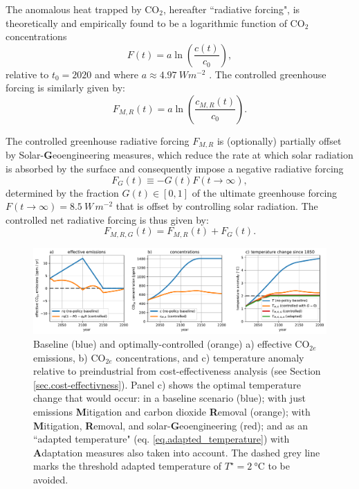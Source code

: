 \documentclass{article}
\begin{document}
The anomalous heat trapped by CO$_{2}$, hereafter ``radiative forcing", is theoretically and empirically found to be a logarithmic function of CO$_{2}$ concentrations
\begin{equation}
    F(t) = a \ln(\frac{c(t)}{c_{0}}),
\end{equation}
relative to $t_{0} = 2020$ and where $a \approx \SI{4.97}{W m^{-2}}$ \citep{geoffroy_transient_2012}. The controlled greenhouse forcing is similarly given by:
\begin{equation}
    F_{M, R}(t) = a \ln(\frac{c_{M, R}(t)}{c_{0}}).
\end{equation}

The controlled greenhouse radiative forcing $F_{M, R}$ is (optionally) partially offset by Solar-\textbf{G}eoengineering measures, which reduce the rate at which solar radiation is absorbed by the surface and consequently impose a negative radiative forcing
\begin{equation}
F_{G}(t) \equiv -G(t)F(t \rightarrow \infty),
\end{equation}
determined by the fraction $G(t) \in [0,1]$ of the ultimate greenhouse forcing  $F(t \rightarrow \infty) = \SI{8.5}{W\, m^{-2}}$ that is offset by controlling solar radiation. The controlled net radiative forcing is thus given by:
\begin{equation}
    F_{M, R, G}(t) = F_{M, R}(t) + F_{G}(t).
\end{equation}

\begin{figure}[htb!]
\noindent\includegraphics[width=1.0\textwidth]{figures/default-temp_carbon_and_temperatures.pdf}
\centering
\caption{Baseline (blue) and optimally-controlled (orange) a) effective CO$_{2e}$ emissions, b) CO$_{2e}$ concentrations, and c) temperature anomaly relative to preindustrial from cost-effectiveness analysis (see Section \ref{sec.cost-effectivness}). Panel c) shows the optimal temperature change that would occur: in a baseline scenario (blue); with just emissions \textbf{M}itigation and carbon dioxide \textbf{R}emoval (orange); with \textbf{M}itigation, \textbf{R}emoval, and solar-\textbf{G}eoengineering (red); and as an ``adapted temperature" (eq. \ref{eq.adapted_temperature}) with \textbf{A}daptation measures also taken into account. The dashed grey line marks the threshold adapted temperature of $T^{\star} = \SI{2}{\celsius}$ to be avoided.}
\label{fig.temp_and_carbon}
\end{figure}
\end{document}
